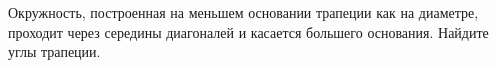 \begin{ex}
	\begin{condition}
		Окружность, построенная на меньшем основании трапеции как на диаметре, проходит через середины диагоналей и касается большего основания. Найдите углы трапеции.
	\end{condition}
	\answer{\( 30\degree, 30\degree, 150\degree, 150\degree\)}
\end{ex}